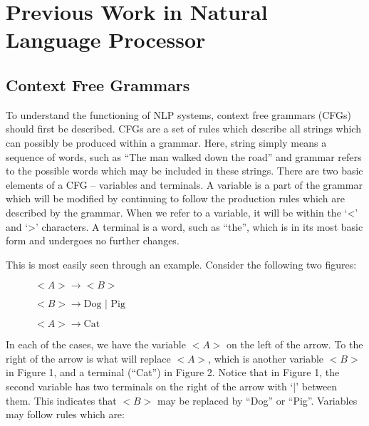\chapter{Previous Work in Natural Language Processor}\label{text}                                                                   
\section{Context Free Grammars}

To understand the functioning of NLP systems, context free grammars (CFGs) should first be described. CFGs are a set of rules which describe all strings which can possibly be produced within a grammar. Here, string simply means a sequence of words, such as ``The man walked down the road'' and grammar refers to the possible words which may be included in these strings. There are two basic elements of a CFG -- variables and terminals. A variable is a part of the grammar which will be modified by continuing to follow the production rules which are described by the grammar. When we refer to a variable, it will be within the `<' and `>' characters. A terminal is a word, such as ``the'', which is in its most basic form and undergoes no further changes. 

This is most easily seen through an example. Consider the following two figures:

\begin{figure}[H]
\centering
\begin{minipage}{.5\textwidth}
  \centering
	$<A> \rightarrow <B>$
	
	$<B> \rightarrow \text{Dog | Pig}$
\end{minipage}%
\begin{minipage}{.5\textwidth}
  \centering
	$<A> \rightarrow \text{Cat}$
\end{minipage}
\end{figure}

In each of the cases, we have the variable $<A>$ on the left of the arrow. To the right of the arrow is what will replace $<A>$, which is another variable $<B>$ in Figure 1, and a terminal (``Cat'') in Figure 2. Notice that in Figure 1, the second variable has two terminals on the right of the arrow with `|' between them. This indicates that $<B>$ may be replaced by ``Dog'' or ``Pig''. Variables may follow rules which are:


